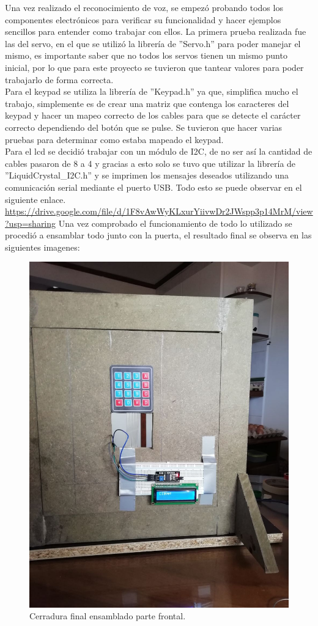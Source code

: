 Una vez realizado el reconocimiento de voz, se empezó probando todos los componentes electrónicos para verificar su funcionalidad y hacer ejemplos sencillos para entender como trabajar con ellos.
La primera prueba realizada fue las del servo, en el que se utilizó la librería de ''Servo.h'' para poder manejar el mismo, es importante saber que no todos los servos tienen un mismo punto inicial, por lo que para este proyecto se tuvieron que tantear valores para poder trabajarlo de forma correcta.\\
Para el keypad se utiliza la librería de ''Keypad.h'' ya que, simplifica mucho el trabajo, simplemente es de crear una matriz que contenga los caracteres del keypad y hacer un mapeo correcto de los cables para que se detecte el carácter correcto dependiendo del botón que se pulse. Se tuvieron que hacer varias pruebas para determinar como estaba mapeado el keypad.\\
Para el lcd se decidió trabajar con un módulo de I2C, de no ser así la cantidad de cables pasaron de 8 a 4 y gracias a esto solo se tuvo que utilizar la librería de ''LiquidCrystal\_I2C.h'' y se imprimen los mensajes deseados utilizando una comunicación serial mediante el puerto USB.
Todo esto se puede observar en el siguiente enlace.
\url{https://drive.google.com/file/d/1F8vAwWyKLxurYiivwDr2JWspp3p14MrM/view?usp=sharing}
Una vez comprobado el funcionamiento de todo lo utilizado se procedió a ensamblar todo junto con la puerta, el resultado final se observa en las siguientes imagenes:
\begin{figure}[H]
    \centering
    \includegraphics[width=.55\linewidth]{Img/FinalFrente.jpeg}
    \caption{Cerradura final ensamblado parte frontal.}
\end{figure}

